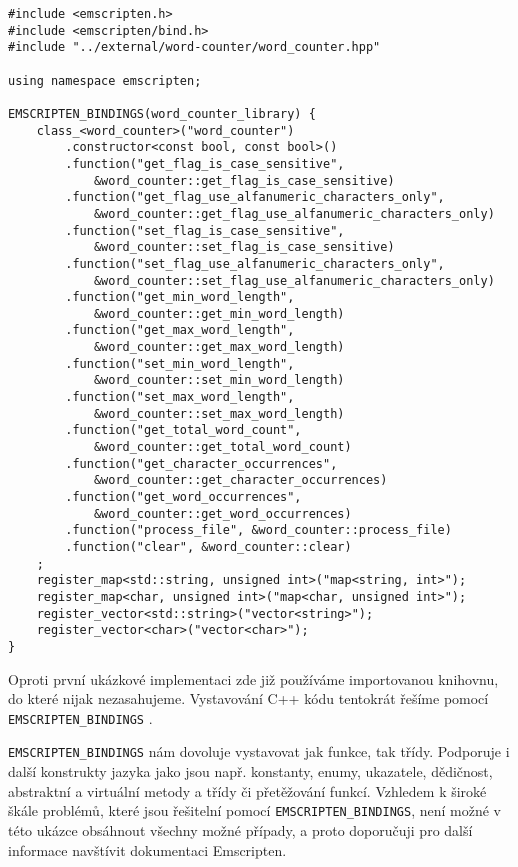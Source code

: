\documentclass{{template/ctuthesis}}
\begin{document}
\begin{verbatim}
#include <emscripten.h>
#include <emscripten/bind.h>
#include "../external/word-counter/word_counter.hpp"

using namespace emscripten;

EMSCRIPTEN_BINDINGS(word_counter_library) {
    class_<word_counter>("word_counter")
        .constructor<const bool, const bool>()
        .function("get_flag_is_case_sensitive",
            &word_counter::get_flag_is_case_sensitive)
        .function("get_flag_use_alfanumeric_characters_only",
            &word_counter::get_flag_use_alfanumeric_characters_only)
        .function("set_flag_is_case_sensitive",
            &word_counter::set_flag_is_case_sensitive)
        .function("set_flag_use_alfanumeric_characters_only",
            &word_counter::set_flag_use_alfanumeric_characters_only)
        .function("get_min_word_length",
            &word_counter::get_min_word_length)
        .function("get_max_word_length",
            &word_counter::get_max_word_length)
        .function("set_min_word_length",
            &word_counter::set_min_word_length)
        .function("set_max_word_length",
            &word_counter::set_max_word_length)
        .function("get_total_word_count",
            &word_counter::get_total_word_count)
        .function("get_character_occurrences",
            &word_counter::get_character_occurrences)
        .function("get_word_occurrences",
            &word_counter::get_word_occurrences)
        .function("process_file", &word_counter::process_file)
        .function("clear", &word_counter::clear)
    ;
    register_map<std::string, unsigned int>("map<string, int>");
    register_map<char, unsigned int>("map<char, unsigned int>");
    register_vector<std::string>("vector<string>");
    register_vector<char>("vector<char>");
}
\end{verbatim}

Oproti první ukázkové implementaci zde již používáme importovanou knihovnu, do které nijak nezasahujeme. Vystavování C++ kódu tentokrát řešíme pomocí \texttt{EMSCRIPTEN\_BINDINGS} \cite{emcc-bind}. 

\texttt{EMSCRIPTEN\_BINDINGS} nám dovoluje vystavovat jak funkce, tak třídy. Podporuje i další konstrukty jazyka jako jsou např. konstanty, enumy, ukazatele, dědičnost, abstraktní a virtuální metody a třídy či přetěžování funkcí. Vzhledem k široké škále problémů, které jsou řešitelní pomocí \texttt{EMSCRIPTEN\_BINDINGS}, není možné v této ukázce obsáhnout všechny možné případy, a proto doporučuji pro další informace navštívit dokumentaci Emscripten.
\end{document}
